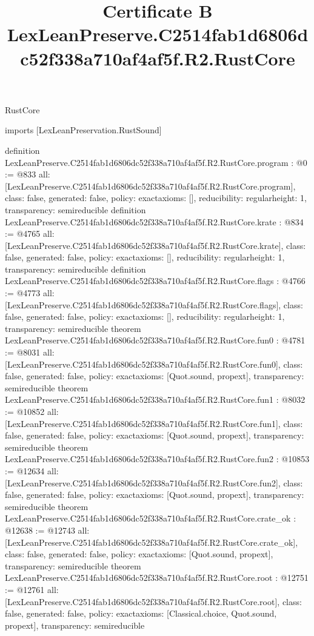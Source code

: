 \begin{lexlean}{RustCore}
\title{Certificate B LexLeanPreserve.C2514fab1d6806dc52f338a710af4af5f.R2.RustCore}
\begin{coremodule}
imports [LexLeanPreservation.RustSound]

definition LexLeanPreserve.C2514fab1d6806dc52f338a710af4af5f.R2.RustCore.program : @0 := @833 {
  all: [LexLeanPreserve.C2514fab1d6806dc52f338a710af4af5f.R2.RustCore.program],
  class: false,
  generated: false,
  policy: exact{axioms: []},
  reducibility: regular{height: 1},
  transparency: semireducible
}
definition LexLeanPreserve.C2514fab1d6806dc52f338a710af4af5f.R2.RustCore.krate : @834 := @4765 {
  all: [LexLeanPreserve.C2514fab1d6806dc52f338a710af4af5f.R2.RustCore.krate],
  class: false,
  generated: false,
  policy: exact{axioms: []},
  reducibility: regular{height: 1},
  transparency: semireducible
}
definition LexLeanPreserve.C2514fab1d6806dc52f338a710af4af5f.R2.RustCore.flags : @4766 := @4773 {
  all: [LexLeanPreserve.C2514fab1d6806dc52f338a710af4af5f.R2.RustCore.flags],
  class: false,
  generated: false,
  policy: exact{axioms: []},
  reducibility: regular{height: 1},
  transparency: semireducible
}
theorem LexLeanPreserve.C2514fab1d6806dc52f338a710af4af5f.R2.RustCore.fun0 : @4781 := @8031 {
  all: [LexLeanPreserve.C2514fab1d6806dc52f338a710af4af5f.R2.RustCore.fun0],
  class: false,
  generated: false,
  policy: exact{axioms: [Quot.sound, propext]},
  transparency: semireducible
}
theorem LexLeanPreserve.C2514fab1d6806dc52f338a710af4af5f.R2.RustCore.fun1 : @8032 := @10852 {
  all: [LexLeanPreserve.C2514fab1d6806dc52f338a710af4af5f.R2.RustCore.fun1],
  class: false,
  generated: false,
  policy: exact{axioms: [Quot.sound, propext]},
  transparency: semireducible
}
theorem LexLeanPreserve.C2514fab1d6806dc52f338a710af4af5f.R2.RustCore.fun2 : @10853 := @12634 {
  all: [LexLeanPreserve.C2514fab1d6806dc52f338a710af4af5f.R2.RustCore.fun2],
  class: false,
  generated: false,
  policy: exact{axioms: [Quot.sound, propext]},
  transparency: semireducible
}
theorem LexLeanPreserve.C2514fab1d6806dc52f338a710af4af5f.R2.RustCore.crate_ok : @12638 := @12743 {
  all: [LexLeanPreserve.C2514fab1d6806dc52f338a710af4af5f.R2.RustCore.crate_ok],
  class: false,
  generated: false,
  policy: exact{axioms: [Quot.sound, propext]},
  transparency: semireducible
}
theorem LexLeanPreserve.C2514fab1d6806dc52f338a710af4af5f.R2.RustCore.root : @12751 := @12761 {
  all: [LexLeanPreserve.C2514fab1d6806dc52f338a710af4af5f.R2.RustCore.root],
  class: false,
  generated: false,
  policy: exact{axioms: [Classical.choice, Quot.sound, propext]},
  transparency: semireducible
}


\end{coremodule}
\end{lexlean}
